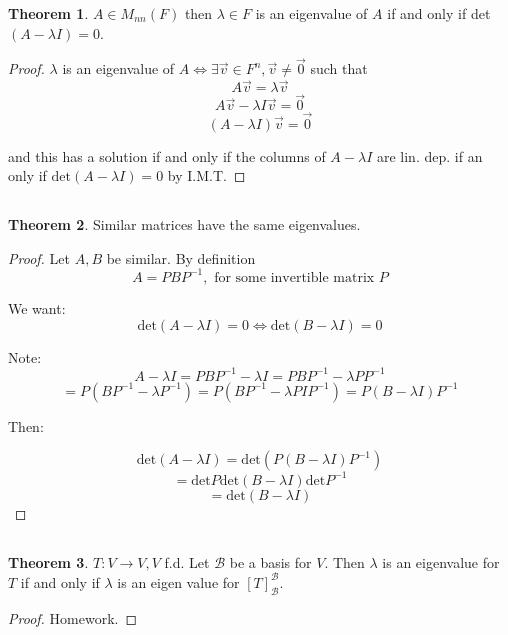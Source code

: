 \documentclass[a4paper,10pt]{article}
\theoremstyle{definition}
\newtheorem{theorem}{Theorem}[section]
\begin{document}
\begin{theorem}
	$A \in M_{nn}(F)$ then $\lambda \in F$ is an eigenvalue of $A$ if and only
	if det$(A-\lambda I) = 0$.
\end{theorem}

\begin{proof}
	$\lambda$ is an eigenvalue of $A \iff \exists \vec{v} \in F^n, \vec{v} \neq
	\vec{0}$ such that
	$$A\vec{v} = \lambda \vec{v}$$
	$$A\vec{v}- \lambda I \vec{v} = \vec{0}$$
	$$(A-\lambda I) \vec{v} = \vec{0}$$

	and this has a solution if and only if the columns of $A-\lambda I$ are lin.
	dep. if an only if $\text{det}(A-\lambda I) = 0$ by I.M.T.
\end{proof}


\subsection{}
\begin{theorem}
	Similar matrices have the same eigenvalues.
\end{theorem}
\begin{proof}
	Let $A,B$ be similar. By definition
	$$A = PBP^{-1}, \text{	for some invertible matrix $P$}$$

	We want:
	$$\text{det} (A - \lambda I ) = 0 \iff \text{det} (B - \lambda I) = 0$$

	Note:
	$$A- \lambda I = PBP^{-1} - \lambda I = PBP^{-1} - \lambda P P^{-1}$$
	$$=P(BP^{-1} - \lambda P^{-1}) = P(BP^{-1} - \lambda P I P^{-1}) =
	P(B-\lambda I)P^{-1}$$

	Then:

	$$\text{det} (A - \lambda I) = \text{det}(P(B - \lambda I )P^{-1})$$
	$$= \text{det}P \text{det}(B - \lambda I )\text{det}P^{-1}$$
	$$= \text{det}(B - \lambda I)$$


\end{proof}

\subsection{}
\begin{theorem}
	$T: V \to V, V$ f.d. Let $\mathcal{B}$ be a basis for $V$. Then $\lambda$ is
	an eigenvalue for $T$ if and only if $\lambda$ is an eigen value for
	$[T]_\mathcal{B}^\mathcal{B}$.
\end{theorem}

\begin{proof}
	Homework.
\end{proof}
\end{document}
